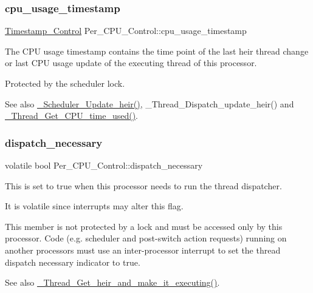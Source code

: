 \subsubsection{\texorpdfstring{cpu\_usage\_timestamp}{cpu\_usage\_timestamp}}
{\footnotesize\ttfamily \mbox{\hyperlink{group__SuperCoreTimeStamp_ga8508036506d5211c98844c88045e2410}{Timestamp\+\_\+\+Control}} Per\+\_\+\+C\+P\+U\+\_\+\+Control\+::cpu\+\_\+usage\+\_\+timestamp}



The C\+PU usage timestamp contains the time point of the last heir thread change or last C\+PU usage update of the executing thread of this processor. 

Protected by the scheduler lock.

\begin{DoxySeeAlso}{See also}
\mbox{\hyperlink{group__RTEMSScoreScheduler_ga29bb7f28ab22ddb95869cc527f2f75bf}{\+\_\+\+Scheduler\+\_\+\+Update\+\_\+heir()}}, \+\_\+\+Thread\+\_\+\+Dispatch\+\_\+update\+\_\+heir() and \mbox{\hyperlink{group__RTEMSScoreThread_gaade6e27239f8126f2c2848e7e2ec7244}{\+\_\+\+Thread\+\_\+\+Get\+\_\+\+C\+P\+U\+\_\+time\+\_\+used()}}. 
\end{DoxySeeAlso}
\mbox{\label{structPer__CPU__Control_a96af7f4805c6b75b775f5304e6c39d99}} 
\subsubsection{\texorpdfstring{dispatch\_necessary}{dispatch\_necessary}}
{\footnotesize\ttfamily volatile bool Per\+\_\+\+C\+P\+U\+\_\+\+Control\+::dispatch\+\_\+necessary}



This is set to true when this processor needs to run the thread dispatcher. 

It is volatile since interrupts may alter this flag.

This member is not protected by a lock and must be accessed only by this processor. Code (e.\+g. scheduler and post-\/switch action requests) running on another processors must use an inter-\/processor interrupt to set the thread dispatch necessary indicator to true.

\begin{DoxySeeAlso}{See also}
\mbox{\hyperlink{group__RTEMSScoreThread_gacd7c2e371fbc36ba623dffe713e6c427}{\+\_\+\+Thread\+\_\+\+Get\+\_\+heir\+\_\+and\+\_\+make\+\_\+it\+\_\+executing()}}. 
\end{DoxySeeAlso}
\mbox{\label{structPer__CPU__Control_ab798eb05fe75cb2f73cae76b1b209bab}} 
